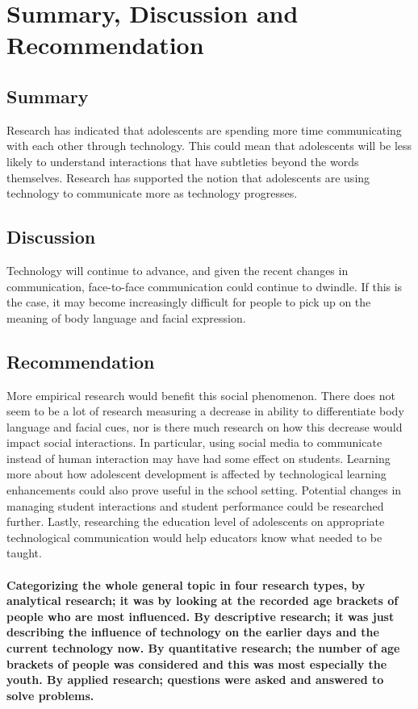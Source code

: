 \documentclass[10pt,]{article}
\begin{document}
\section{Summary, Discussion and Recommendation}

\subsection{Summary}
Research has indicated that adolescents are spending more time communicating with each other through technology. This could mean that adolescents will be less likely to understand interactions that have subtleties beyond the words themselves. Research has supported the notion that adolescents are using technology to communicate more as technology progresses. 


\subsection{Discussion}
Technology will continue to advance, and given the recent changes in communication, face-to-face communication could continue to dwindle. If this is the case, it may become increasingly difficult for people to pick up on the meaning of body language and facial expression.
\subsection{Recommendation}
More empirical research would benefit this social phenomenon. There does not seem to be a lot of research measuring a decrease in ability to differentiate body language and facial cues, nor is there much research on how this decrease would impact social interactions. In particular, using social media to communicate instead of human interaction may have had some effect on students. Learning more about how adolescent development is affected by technological learning enhancements could also prove useful in the school setting. Potential changes in managing student interactions and student performance could be researched further. Lastly, researching the education level of adolescents on appropriate technological communication would help educators know what needed to be taught.
\paragraph{Categorizing the whole general topic in four research types, by analytical research; it was by looking at the recorded age brackets of people who are most influenced. By descriptive research; it was just describing the influence of technology on the earlier days and the current technology now. By quantitative research; the number of age brackets of people was considered and this was most especially the youth. By applied research; questions were asked and answered to solve problems.} 
\end{document}
